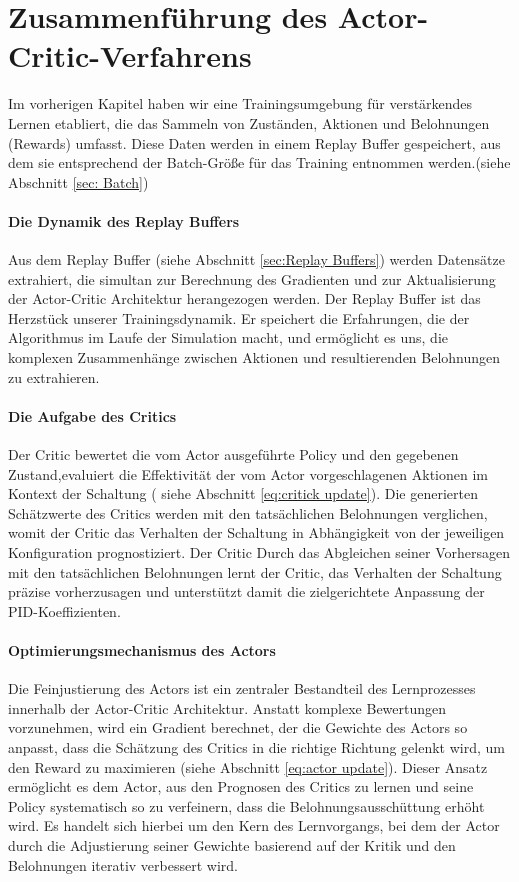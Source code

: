 \section{Zusammenführung des Actor-Critic-Verfahrens}
\label{sec:Synthesis_Actor_Critic}

Im vorherigen Kapitel haben wir eine Trainingsumgebung für verstärkendes Lernen etabliert, die das Sammeln von Zuständen, Aktionen und Belohnungen (Rewards) umfasst. Diese Daten werden in einem Replay Buffer gespeichert, aus dem sie entsprechend der Batch-Größe  für das Training entnommen werden.(siehe Abschnitt \ref{sec: Batch})

\paragraph{Die Dynamik des Replay Buffers}
Aus dem Replay Buffer (siehe Abschnitt  \ref{sec:Replay Buffers}) werden Datensätze extrahiert, die simultan zur Berechnung des Gradienten und zur Aktualisierung der Actor-Critic Architektur herangezogen werden.
Der Replay Buffer ist das Herzstück unserer Trainingsdynamik. Er speichert die Erfahrungen, die der Algorithmus im Laufe der Simulation macht, und ermöglicht es uns, die komplexen Zusammenhänge zwischen Aktionen und resultierenden Belohnungen zu extrahieren.

\paragraph{Die Aufgabe des Critics}
Der Critic bewertet die vom Actor ausgeführte Policy und den gegebenen Zustand,evaluiert die Effektivität der vom Actor vorgeschlagenen Aktionen im Kontext der Schaltung ( siehe Abschnitt \ref{eq:critick update}). Die generierten Schätzwerte des Critics werden mit den tatsächlichen Belohnungen verglichen, womit der Critic das Verhalten der Schaltung in Abhängigkeit von der jeweiligen Konfiguration prognostiziert. Der Critic  Durch das Abgleichen seiner Vorhersagen mit den tatsächlichen Belohnungen lernt der Critic, das Verhalten der Schaltung präzise vorherzusagen und unterstützt damit die zielgerichtete Anpassung der PID-Koeffizienten.

\paragraph{Optimierungsmechanismus des Actors}
Die Feinjustierung des Actors ist ein zentraler Bestandteil des Lernprozesses innerhalb der Actor-Critic Architektur. Anstatt komplexe Bewertungen vorzunehmen, wird ein Gradient berechnet, der die Gewichte des Actors so anpasst, dass die Schätzung des Critics in die richtige Richtung gelenkt wird, um den Reward zu maximieren (siehe Abschnitt \ref{eq:actor update}). Dieser Ansatz ermöglicht es dem Actor, aus den Prognosen des Critics zu lernen und seine Policy systematisch so zu verfeinern, dass die Belohnungsausschüttung erhöht wird. Es handelt sich hierbei um den Kern des Lernvorgangs, bei dem der Actor durch die Adjustierung seiner Gewichte basierend auf der Kritik und den Belohnungen iterativ verbessert wird.

